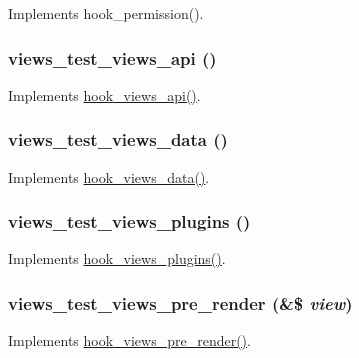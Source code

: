 \label{views__test_8module_a5768b933d9689c113d322f2904be336a}
Implements hook\_\-permission(). \hypertarget{views__test_8module_afc691cec43665bc3c566210bf1a5cdbd}{
\subsubsection[{views\_\-test\_\-views\_\-api}]{\setlength{\rightskip}{0pt plus 5cm}views\_\-test\_\-views\_\-api ()}}
\label{views__test_8module_afc691cec43665bc3c566210bf1a5cdbd}
Implements \hyperlink{group__views__hooks_gac67ffd4a2f61f9814ee37b541c472c47}{hook\_\-views\_\-api()}. \hypertarget{views__test_8module_a97293d465c8d574b6be39b11d79f1a13}{
\subsubsection[{views\_\-test\_\-views\_\-data}]{\setlength{\rightskip}{0pt plus 5cm}views\_\-test\_\-views\_\-data ()}}
\label{views__test_8module_a97293d465c8d574b6be39b11d79f1a13}
Implements \hyperlink{group__views__hooks_ga227057901681e4a33e33c199c7a8c989}{hook\_\-views\_\-data()}. \hypertarget{views__test_8module_a1d92c7f29f0341731c7a9d4d5468f888}{
\subsubsection[{views\_\-test\_\-views\_\-plugins}]{\setlength{\rightskip}{0pt plus 5cm}views\_\-test\_\-views\_\-plugins ()}}
\label{views__test_8module_a1d92c7f29f0341731c7a9d4d5468f888}
Implements \hyperlink{group__views__hooks_ga23f6e9972b2ed84fc54b7ff63f44477d}{hook\_\-views\_\-plugins()}. \hypertarget{views__test_8module_ae5532b352f8358a411334ad3e1bb654f}{
\subsubsection[{views\_\-test\_\-views\_\-pre\_\-render}]{\setlength{\rightskip}{0pt plus 5cm}views\_\-test\_\-views\_\-pre\_\-render (\&\$ {\em view})}}
\label{views__test_8module_ae5532b352f8358a411334ad3e1bb654f}
Implements \hyperlink{group__views__hooks_gab88d5c49ec4ad30dba2be34327d5b0cc}{hook\_\-views\_\-pre\_\-render()}. 